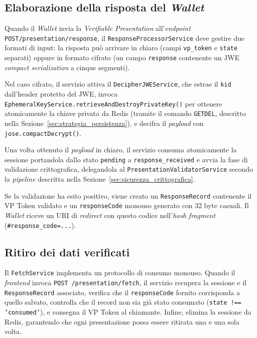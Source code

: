 \subsection{Elaborazione della risposta del \textit{Wallet}}
Quando il \textit{Wallet} invia la \textit{Verifiable Presentation} all'\textit{endpoint} \texttt{POST/presentation/response}, il \texttt{ResponseProcessorService} deve gestire due formati di input: la risposta può arrivare in chiaro (campi \texttt{vp\_\allowbreak{}token} e \texttt{state} separati) oppure in formato cifrato (un campo \texttt{response} contenente un JWE \textit{compact serialization} a cinque segmenti).

Nel caso cifrato, il servizio attiva il \texttt{DecipherJWEService}, che estrae il \texttt{kid} dall'header protetto del JWE, invoca \texttt{EphemeralKeyService.retrieveAndDestroyPrivateKey()} per ottenere atomicamente la chiave privata da Redis (tramite il comando \texttt{GETDEL}, descritto nella Sezione~\ref{sec:strategia_persistenza}), e decifra il \textit{payload} con \texttt{jose.compactDecrypt()}.

Una volta ottenuto il \textit{payload} in chiaro, il servizio consuma atomicamente la sessione portandola dallo stato \texttt{pending} a \texttt{response\_\allowbreak{}received} e avvia la fase di validazione crittografica, delegandola al \texttt{PresentationValidatorService} secondo la \textit{pipeline} descritta nella Sezione~\ref{sec:sicurezza_crittografica}.

Se la validazione ha esito positivo, viene creato un \texttt{ResponseRecord} contenente il VP Token validato e un \texttt{responseCode} monouso generato con 32 byte casuali. Il \textit{Wallet} riceve un URI di \textit{redirect} con questo codice nell'\textit{hash fragment} (\texttt{\#response\_\allowbreak{}code=...}).

\subsection{Ritiro dei dati verificati}
Il \texttt{FetchService} implementa un protocollo di consumo monouso. Quando il \textit{frontend} invoca \texttt{POST /presentation/fetch}, il servizio recupera la sessione e il \texttt{ResponseRecord} associato, verifica che il \texttt{responseCode} fornito corrisponda a quello salvato, controlla che il record non sia già stato consumato (\texttt{state !== 'consumed'}), e consegna il VP Token al chiamante. Infine, elimina la sessione da Redis, garantendo che ogni presentazione possa essere ritirata una e una sola volta.


